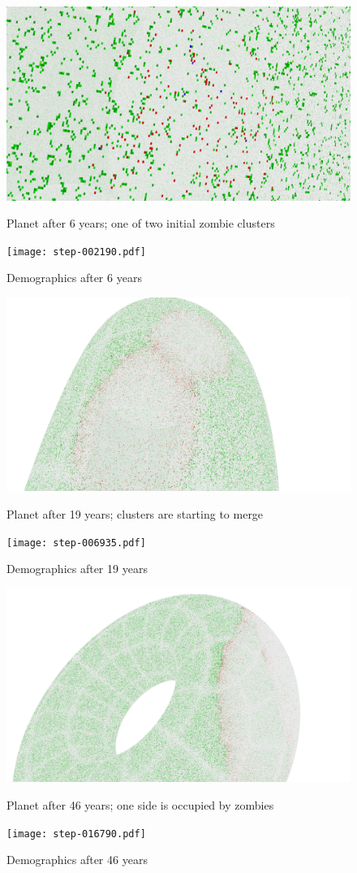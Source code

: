 \documentclass[a4paper]{article}
\begin{document}
\begin{figure}[pht]
    \centering
    \includegraphics[width=\textwidth]{torus/step-002190-torus.png}
    \caption{Planet after 6 years; one of two initial zombie clusters}
    \texttt{[image: step-002190.pdf]}
    \caption{Demographics after 6 years}
\end{figure}

\begin{figure}[pht]
    \centering
    \includegraphics[width=\textwidth]{torus/step-006935-torus.png}
    \caption{Planet after 19 years; clusters are starting to merge}
    \texttt{[image: step-006935.pdf]}
    \caption{Demographics after 19 years}
\end{figure}

\begin{figure}[pht]
    \centering
    \includegraphics[width=\textwidth]{torus/step-016790-torus.png}
    \caption{Planet after 46 years; one side is occupied by zombies}
    \texttt{[image: step-016790.pdf]}
    \caption{Demographics after 46 years}
\end{figure}
\end{document}
